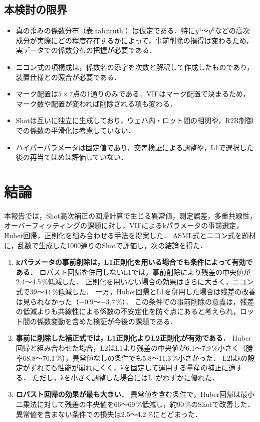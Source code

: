 \documentclass[11pt,a4paper]{ltjsarticle}
\begin{document}
\subsection{本検討の限界}

\begin{itemize}
  \item 真の歪みの係数分布（表\ref{tab:truth}）は仮定である．特に$y^4$〜$y^6$などの高次成分が実際にどの程度存在するかによって，事前削除の損得は変わるため，実データでの係数分布の把握が必要である．
  \item ニコン式の項構成は，係数名の添字を次数と解釈して作成したものであり，装置仕様との照合が必要である．
  \item マーク配置は$5\times7$点の1通りのみである．VIFはマーク配置で決まるため，マーク数や配置が変われば削除される項も変わる．
  \item Shotは互いに独立に生成しており，ウェハ内・ロット間の相関や，R2R制御での係数の平滑化は考慮していない．
  \item ハイパーパラメータは固定値であり，交差検証による調整や，L1で選択した後の再当てはめは評価していない．
\end{itemize}

\section{結論}

本報告では，Shot高次補正の回帰計算で生じる異常値，測定誤差，多重共線性，オーバーフィッティングの課題に対し，VIFによるkパラメータの事前選定，Huber回帰，正則化を組み合わせる手法を提案した．
ASML式とニコン式を題材に，乱数で生成した1000通りのShotで評価し，次の結論を得た．

\begin{enumerate}
  \item \textbf{kパラメータの事前削除は，L1正則化を用いる場合でも条件によって有効である．}
        ロバスト回帰を併用しないL1では，事前削除により残差の中央値が2.4〜4.5\,\%低減した．
        正則化を用いない場合の効果はさらに大きく，ニコン式で39〜44\,\%低減した．
        一方，Huber回帰とL1を併用した場合は残差の改善は見られなかった（$-0.9$〜$-3.7$\,\%）．
        この条件での事前削除の意義は，残差の低減よりも共線性による係数の不安定化を防ぐ点にあると考えられ，ロット間の係数変動を含めた検証が今後の課題である．
  \item \textbf{事前に削除した補正式では，L1正則化よりL2正則化が有効である．}
        Huber回帰と組み合わせた場合，L2はL1より残差の中央値が6.1〜7.9\,\%小さく（勝率68.8〜70.1\,\%），異常値なしの条件でも5.8〜11.3\,\%小さかった．
        L2はλの設定がずれても性能が崩れにくく，λを固定して運用する量産の補正に適する．
        ただし，λを小さく調整した場合にはL1がわずかに優れた．
  \item \textbf{ロバスト回帰の効果が最も大きい．}
        異常値を含む条件で，Huber回帰は最小二乗法に対して残差の中央値を66〜69\,\%低減し，約90\,\%のShotで改善した．
        異常値を含まない条件での損失は2.5〜4.2\,\%にとどまった．
\end{enumerate}
\end{document}
